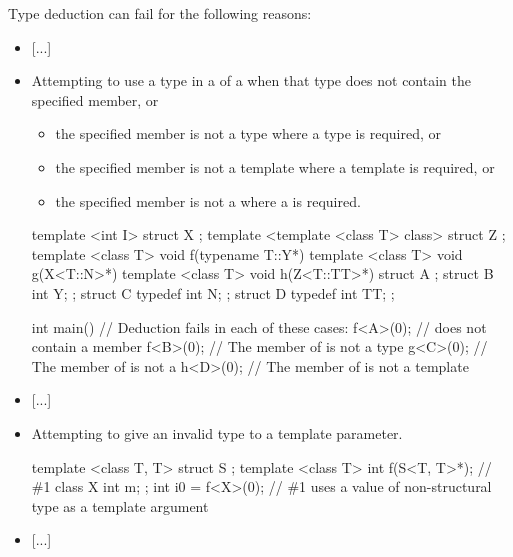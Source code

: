 \documentclass{wg21}
\begin{document}
\begin{note}
Type deduction can fail for the following reasons:
\begin{itemize}
\item
\textcolor{noteclr}{[...]}
\item
Attempting to use a type in a  of a
 when
that type does not contain the specified member, or
\begin{itemize}
\item
the specified member is not a type where a type is required, or
\item
the specified member is not a template where a template is required, or
\item
the specified member is not a  where a  is required.
\end{itemize}
\begin{example}
\begin{codeblock}
    template <int I> struct X { };
    template <template <class T> class> struct Z { };
    template <class T> void f(typename T::Y*) {}
    template <class T> void g(X<T::N>*) {}
    template <class T> void h(Z<T::TT>*) {}
    struct A {};
    struct B { int Y; };
    struct C {
        typedef int N;
    };
    struct D {
        typedef int TT;
    };

    int main() {
        // Deduction fails in each of these cases:
        f<A>(0);          //  does not contain a member 
        f<B>(0);          // The  member of  is not a type
        g<C>(0);          // The  member of  is not a 
        h<D>(0);          // The  member of  is not a template
    }
\end{codeblock}
\end{example}
\item
\textcolor{noteclr}{[...]}
\item
Attempting to give an invalid type to a  template parameter.
\begin{example}
    \begin{codeblock}
        template <class T, T> struct S {};
        template <class T> int f(S<T, T{}>*);   // \#1
        class X {
            int m;
        };
        int i0 = f<X>(0);   // \#1 uses a value of non-structural type  as a  template argument
    \end{codeblock}
\end{example}
\item
\textcolor{noteclr}{[...]}
\end{itemize}
\end{note}
\end{document}
